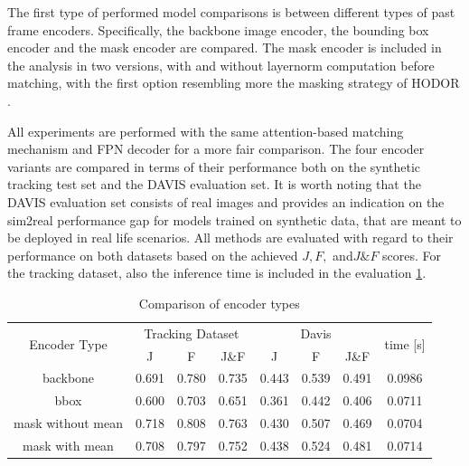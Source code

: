 The first type of performed model comparisons is between different types of past frame encoders. Specifically, the backbone image encoder, the bounding box encoder and the mask encoder are compared. The mask encoder is included in the analysis in two versions, with and without layernorm computation before matching, with the first option resembling more the masking strategy of HODOR \parencite{athar2022hodor}. \par
All experiments are performed with the same attention-based matching mechanism and FPN decoder for a more fair comparison. The four encoder variants are compared in terms of their performance both on the synthetic tracking test set and the DAVIS evaluation set. It is worth noting that the DAVIS evaluation set consists of real images and provides an indication on the \gls{sim2real} performance gap for models trained on synthetic data, that are meant to be deployed in real life scenarios. All methods are evaluated with regard to their performance on both datasets based on the achieved $J, F,$ and$ J\&F$ scores. For the tracking dataset, also the inference time is included in the evaluation \tabref\ref{Tab:encoder_comparisons}. \par

\begin{table} [ht!]
\caption{Comparison of encoder types}
\centering
\begin{tabular}{|c|ccc|ccc|c|}
\hline
\multicolumn{1}{|c|}{\multirow{2}{*}{Encoder Type}} & \multicolumn{3}{c|}{Tracking Dataset}                                              & \multicolumn{3}{c|}{Davis} & \multicolumn{1}{c|}{\multirow{2}{*}{time [s]}}                                                         \\ \cline{2-7} 
\multicolumn{1}{|c|}{}                              & \multicolumn{1}{c|}{J} & \multicolumn{1}{c|}{F} & \multicolumn{1}{c|}{J\&F} & \multicolumn{1}{c|}{J} & \multicolumn{1}{c|}{F} & \multicolumn{1}{c|}{J\&F}  & \multicolumn{1}{c|}{}                             \\ \hline

backbone    &   0.691  &  0.780  &  0.735 &   0.443   &  0.539   &    0.491  & 0.0986   \\ 

bbox &  0.600 &   0.703   &   0.651    &   0.361     &   0.442      &  0.406  &  0.0711 \\ 

mask without mean  &   0.718 &   0.808   &   0.763   &  0.430  & 0.507  & 0.469   & 0.0704 \\ 

mask with mean  &  0.708 &   0.797  & 0.752    & 0.438 & 0.524  & 0.481  & 0.0714  \\ \hline

\end{tabular}
 \label{Tab:encoder_comparisons}
\end{table}




